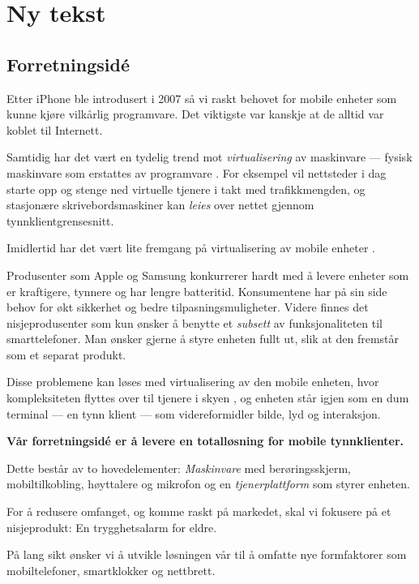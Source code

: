 \chapter{Ny tekst}

\section{Forretningsidé}

Etter iPhone ble introdusert i 2007 så vi raskt behovet for mobile enheter som
kunne kjøre vilkårlig programvare. Det viktigste var kanskje at de alltid var
koblet til Internett.

Samtidig har det vært en tydelig trend mot \textit{virtualisering} av
maskinvare --- fysisk maskinvare som erstattes av programvare
\cite{2006.virtualization.trends}.  For eksempel vil nettsteder i dag starte
opp og stenge ned virtuelle tjenere i takt med trafikkmengden, og stasjonære
skrivebordsmaskiner kan \textit{leies} over nettet gjennom
tynnklientgrensesnitt.

Imidlertid har det vært lite fremgang på virtualisering av mobile enheter
\cite{embedded.virtualization}.

Produsenter som Apple og Samsung konkurrerer hardt med å levere enheter som er
kraftigere, tynnere og har lengre batteritid.
%
Konsumentene har på sin side behov for økt sikkerhet og bedre
tilpasningsmuligheter.
%
Videre finnes det nisjeprodusenter som kun ønsker å benytte et \textit{subsett}
av funksjonaliteten til smarttelefoner.
%
Man ønsker gjerne å styre enheten fullt ut, slik at den fremstår som et separat
produkt.

Disse problemene kan løses med virtualisering av den mobile enheten, hvor
kompleksiteten flyttes over til tjenere i skyen \cite{mobil.virt.fordel}, og
enheten står igjen som en dum terminal --- en tynn klient --- som
videreformidler bilde, lyd og interaksjon.

\textbf{Vår forretningsidé er å levere en totalløsning for mobile
tynnklienter.}

Dette består av to hovedelementer: \textit{Maskinvare} med
berøringsskjerm, mobiltilkobling, høyttalere og mikrofon og en
\textit{tjenerplattform} som styrer enheten.

For å redusere omfanget, og komme raskt på markedet, skal vi fokusere på et
nisjeprodukt: En trygghetsalarm for eldre.

På lang sikt ønsker vi å utvikle løsningen vår til å omfatte nye formfaktorer
som mobiltelefoner, smartklokker og nettbrett.

